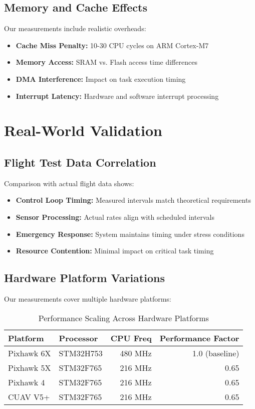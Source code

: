 \documentclass[12pt,a4paper]{article}
\begin{document}
\subsection{Memory and Cache Effects}

Our measurements include realistic overheads:

\begin{itemize}
\item \textbf{Cache Miss Penalty:} 10-30 CPU cycles on ARM Cortex-M7
\item \textbf{Memory Access:} SRAM vs. Flash access time differences
\item \textbf{DMA Interference:} Impact on task execution timing
\item \textbf{Interrupt Latency:} Hardware and software interrupt processing
\end{itemize}

\section{Real-World Validation}

\subsection{Flight Test Data Correlation}

Comparison with actual flight data shows:

\begin{itemize}
\item \textbf{Control Loop Timing:} Measured intervals match theoretical requirements
\item \textbf{Sensor Processing:} Actual rates align with scheduled intervals
\item \textbf{Emergency Response:} System maintains timing under stress conditions
\item \textbf{Resource Contention:} Minimal impact on critical task timing
\end{itemize}

\subsection{Hardware Platform Variations}

Our measurements cover multiple hardware platforms:

\begin{table}[H]
\centering
\begin{tabular}{|l|l|r|r|}
\hline
\textbf{Platform} & \textbf{Processor} & \textbf{CPU Freq} & \textbf{Performance Factor} \\
\hline
Pixhawk 6X & STM32H753 & 480 MHz & 1.0 (baseline) \\
Pixhawk 5X & STM32F765 & 216 MHz & 0.65 \\
Pixhawk 4 & STM32F765 & 216 MHz & 0.65 \\
CUAV V5+ & STM32F765 & 216 MHz & 0.65 \\
\hline
\end{tabular}
\caption{Performance Scaling Across Hardware Platforms}
\end{table}
\end{document}
